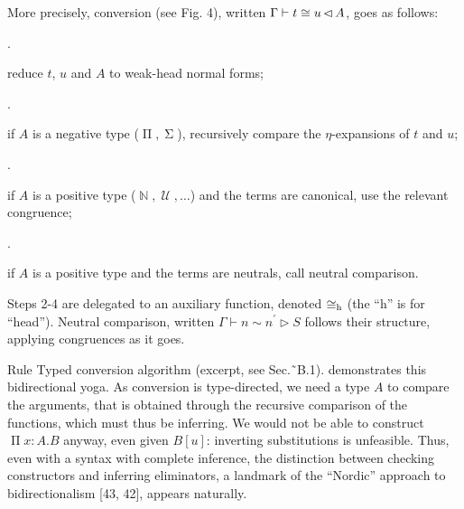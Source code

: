  
 
More precisely, conversion (see Fig. 4), written $\Gamma\vdash t\mathrel{\raisebox{-0.5pt}{$\cong$}}u\operatorname{\mathrel{\lhd%
}}A$, goes as follows:\par
  
\par{}. 
 
reduce $t$, $u$ and $A$ to weak-head normal forms;\par
 
 
 
\par{}. 
 
if $A$ is a negative type ($\operatorname{\Pi},\operatorname{\Sigma}$), recursively compare the $\eta$-expansions of $t$ and $u$;\par
 
 
 
\par{}. 
 
if $A$ is a positive type ($\operatorname{\mathbb{N}},\operatorname{\mathcal{U}},\dots$) and the terms are canonical, use the relevant congruence;\par
 
 
 
\par{}. 
 
if $A$ is a positive type and the terms are neutrals, call neutral comparison.\par
 
 
  
Steps 2-4 are delegated to an auxiliary function, denoted $\mathrel{\raisebox{-0.5pt}{$\cong$}}_{\mathrm{h}}$ (the “h” is for “head”). Neutral comparison, written $\Gamma\vdash n\sim n^{\prime}\mathrel{\rhd}S$ follows their structure, applying congruences as it goes.\par
 
 
 
Rule   Typed conversion algorithm (excerpt, see Sec.˜B.1). demonstrates this bidirectional yoga. As conversion is type-directed, we need a type $A$ to compare the arguments, that is obtained through the recursive comparison of the functions, which must thus be inferring. We would not be able to construct $\operatorname{\Pi}x:A.B$ anyway, even given $B\mathord{\left[u\right]}$: inverting substitutions is unfeasible. Thus, even with a syntax with complete inference, the distinction between checking constructors and inferring eliminators, a landmark of the “Nordic” approach to bidirectionalism [43, 42], appears naturally.\par
 
